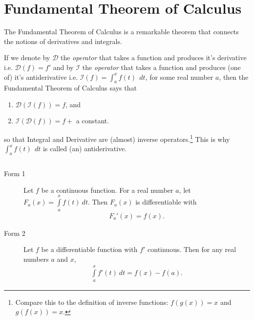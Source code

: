 \section{Fundamental Theorem of Calculus}

The Fundamental Theorem of Calculus is a remarkable theorem that connects the notions of derivatives and integrals.

If we denote by $\mathcal{D}$ the {\it operator} that takes a function and produces it's derivative i.e. $\mathcal{D}(f) = f'$ and by $\mathcal{I}$ the {\it operator} that takes a function and produces (one of) it's antiderivative i.e. $\mathcal{I}(f) = \int_a^x f(t) \: \:dt$, for some real number $a$, then the Fundamental Theorem of Calculus says that
\begin{enumerate}
	\item $\mathcal{D}(\mathcal{I}(f)) = f$, and
	\item  $\mathcal{I}(\mathcal{D}(f)) = f + $ a constant.
\end{enumerate} so that Integral and Derivative are (almost) inverse operators.\footnote{Compare this to the definition of inverse functions: $f(g(x)) = x$ and $g(f(x)) = x$.} This is why $\int_a^x f(t) \: \:dt$ is called (an) {antiderivative}.\\



\begin{theorem}$ $
	\begin{description}
		\item[Form 1] Let $f$ be a continuous function. For a real number $a$, let $ F_a(x) = \int \limits_a^x f(t) \:dt$.
		      Then $F_a(x)$ is differentiable with
		      \begin{align*}
			      F_a'(x) = f(x).
		      \end{align*}
		\item[Form 2]
		      Let $f$ be a differentiable function with $f'$ continuous. Then for any real numbers $a$ and $x$,
		      \begin{align*}
			      \int \limits_a^x f'(t) \:dt = f(x) - f(a).
		      \end{align*}
	\end{description}
\end{theorem}

